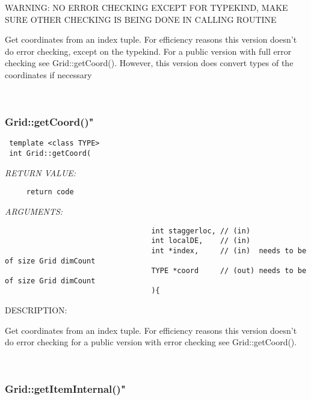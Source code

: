   
    WARNING: NO ERROR CHECKING EXCEPT FOR TYPEKIND, MAKE SURE OTHER CHECKING IS BEING DONE IN CALLING ROUTINE
  
    Get coordinates from an index tuple. For efficiency reasons this version doesn't do error checking, except
    on the typekind. For a public version with full error checking see  Grid::getCoord(). 
    However, this version does convert types of the coordinates if necessary
  
   
 
\mbox{}\hrulefill\
 
\subsubsection [Grid::getCoord()"] {Grid::getCoord()"}


  
\begin{verbatim} template <class TYPE>
 int Grid::getCoord(\end{verbatim}{\em RETURN VALUE:}
\begin{verbatim}     return code
     \end{verbatim}{\em ARGUMENTS:}
\begin{verbatim}                                  int staggerloc, // (in)
                                  int localDE,    // (in)
                                  int *index,     // (in)  needs to be of size Grid dimCount
                                  TYPE *coord     // (out) needs to be of size Grid dimCount
                                  ){\end{verbatim}
{\sf DESCRIPTION:\\ }


    Get coordinates from an index tuple. For efficiency reasons this version doesn't do error checking
    for a public version with error checking see  Grid::getCoord().  
  
   
 
\mbox{}\hrulefill\
 
\subsubsection [Grid::getItemInternal()"] {Grid::getItemInternal()"}


